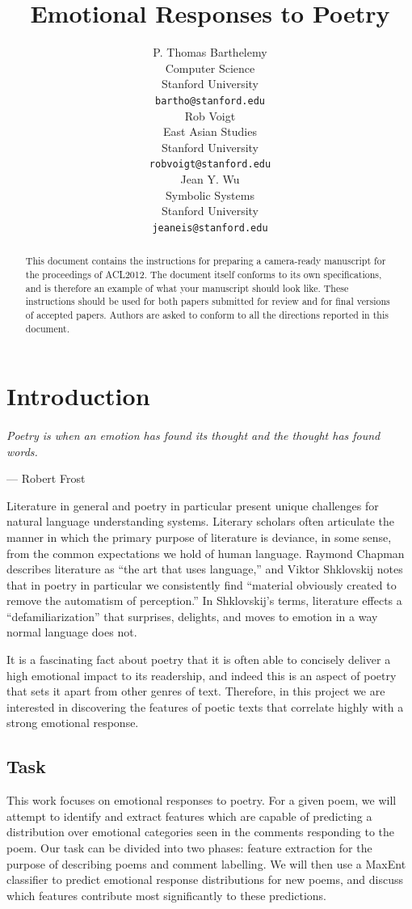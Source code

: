 \documentclass[11pt]{article}
\title{Emotional Responses to Poetry}
\author{P. Thomas Barthelemy \\
  Computer Science\\
  Stanford University \\
  {\tt bartho@stanford.edu} \\\And
  Rob Voigt \\
  East Asian Studies \\
  Stanford University \\
  {\tt robvoigt@stanford.edu} \\\And
  Jean Y. Wu \\
  Symbolic Systems  \\
  Stanford University\\
  {\tt jeaneis@stanford.edu} \\}
\date{}
\begin{document}
\maketitle
\begin{abstract}
  This document contains the instructions for preparing a camera-ready manuscript for the proceedings of ACL2012. The document itself conforms to its own specifications, and is therefore an example of what your manuscript should look like. These instructions should be used for both papers submitted for review and for final versions of accepted papers. Authors are asked to conform to all the directions reported in this document.
\end{abstract}

\section{Introduction}

\paragraph{}
\emph{Poetry is when an emotion has found its thought and the thought has found words.}
\begin{flushright}
--- Robert Frost\\
\end{flushright}


Literature in general and poetry in particular present unique challenges for natural language understanding systems. Literary scholars often articulate the manner in which the primary purpose of literature is deviance, in some sense, from the common expectations we hold of human language. Raymond Chapman describes literature as ``the art that uses language,'' and Viktor Shklovskij notes that in poetry in particular we consistently find ``material obviously created to remove the automatism of perception.'' In Shklovskij's terms, literature effects a ``defamiliarization'' that surprises, delights, and moves to emotion in a way normal language does not.

It is a fascinating fact about poetry that it is often able to concisely deliver a high emotional impact to its readership, and indeed this is an aspect of poetry that sets it apart from other genres of text. Therefore, in this project we are interested in discovering the features of poetic texts that correlate highly with a strong emotional response.


\subsection*{Task}
This work focuses on emotional responses to poetry. For a given poem, we will attempt to identify and extract features which are capable of predicting a distribution over emotional categories seen in the comments responding to the poem. Our task can be divided into two phases: feature extraction for the purpose of describing poems and comment labelling. We will then use a MaxEnt classifier to predict emotional response distributions for new poems, and discuss which features contribute most significantly to these predictions.
\end{document}
